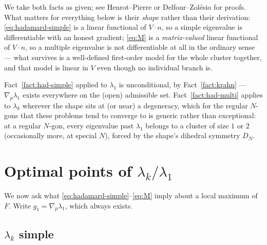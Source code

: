 \documentclass[11pt]{article}
\theoremstyle{plain}
\begin{document}
We take both facts as given; see Henrot--Pierre or Delfour--Zol\'esio for proofs. What matters for
everything below is their \emph{shape} rather than their derivation: \eqref{eq:hadamard-simple} is
a linear functional of $V\cdot n$, so a simple eigenvalue is differentiable with an honest
gradient; \eqref{eq:M} is a \emph{matrix-valued} linear functional of $V\cdot n$, so a multiple
eigenvalue is not differentiable at all in the ordinary sense --- what survives is a well-defined
first-order model for the whole cluster together, and that model is linear in $V$ even though no
individual branch is.

Fact~\ref{fact:had-simple} applied to $\lambda_1$ is unconditional, by
Fact~\ref{fact:krahn} --- $\nabla_p\lambda_1$ exists everywhere on the (open) admissible set.
Fact~\ref{fact:had-multi} applies to $\lambda_k$ wherever the shape sits at (or near) a
degeneracy, which for the regular $N$-gons that these problems tend to converge to is generic
rather than exceptional: at a regular $N$-gon, every eigenvalue past $\lambda_1$ belongs to a
cluster of size $1$ or $2$ (occasionally more, at special $N$), forced by the shape's dihedral
symmetry $D_N$.

\section{Optimal points of $\lambda_k/\lambda_1$}\label{sec:optimal}

We now ask what \eqref{eq:hadamard-simple}--\eqref{eq:M} imply about a local maximum of $F$. Write
$g_1=\nabla_p\lambda_1$, which always exists.

\subsection{$\lambda_k$ simple}\label{sec:simple}
\end{document}
